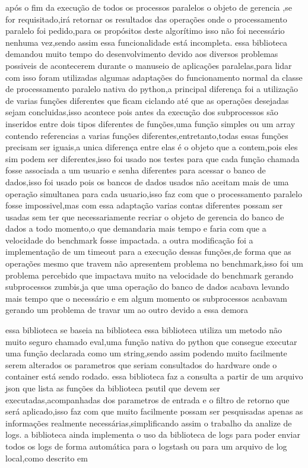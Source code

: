 \documentclass[
	12pt,				%
	openright,			%
	oneside,			%
	a4paper,			%
	english,			%
	french,				%
	spanish,			%
	brazil,				%
	]{abntex2}
\begin{document}
após o fim da execução de todos os processos paralelos o objeto de gerencia ,se for requisitado,irá retornar os resultados das operações onde o processamento paralelo foi pedido,para os propósitos deste algorítimo isso não foi necessário nenhuma vez,sendo assim essa funcionalidade está incompleta.
essa biblioteca demandou muito tempo do desenvolvimento devido aos diversos problemas possiveis de acontecerem durante o manuseio de aplicações paralelas,para lidar com isso foram utilizadas algumas adaptações do funcionamento normal da classe de processamento paralelo nativa do python,a principal diferença foi a utilização de varias funções diferentes que ficam ciclando até que as operações desejadas sejam concluidas,isso acontece pois antes da execução dos subprocessos são inseridos entre dois tipos diferentes de funções,uma função simples ou um array contendo referencias a varias funções diferentes,entretanto,todas essas funções precisam ser iguais,a unica diferença entre elas é o objeto que a contem,pois eles sim podem ser diferentes,isso foi usado nos testes para que cada função chamada fosse associada a um usuario e senha diferentes para acessar o banco de dados,isso foi usado pois os bancos de dados usados não aceitam mais de uma operação simultanea para cada usuario,isso faz com que o processamento paralelo fosse impossivel,mas com essa adaptação varias contas diferentes possam ser usadas sem ter que necessariamente recriar o objeto de gerencia do banco de dados a todo momento,o que demandaria mais tempo e faria com que a velocidade do benchmark fosse impactada.
a outra modificação foi a implementação de um timeout para a execução dessas funções,de forma que as operações mesmo que travem não apresentem problema no benchmark,isso foi um problema percebido que impactava muito na velocidade do benchmark gerando subprocessos zumbis,ja que uma operação do banco de dados acabava levando mais tempo que o necessário e em algum momento os subprocessos acabavam gerando um problema de travar um ao outro devido a essa demora

essa biblioteca se baseia na biblioteca  essa biblioteca utiliza um metodo não muito seguro chamado eval,uma função nativa do python que consegue executar uma função declarada como um string,sendo assim podendo muito facilmente serem alterados os parametros que seriam consultados do hardware onde o container está sendo rodado.
essa biblioteca faz a consulta a partir de um arquivo json que lista as funções da biblioteca psutil que devem ser executadas,acompanhadas dos parametros de entrada e o filtro de retorno que será aplicado,isso faz com que muito facilmente possam ser pesquisadas apenas as informações realmente necessárias,simplificando assim o trabalho da analize de logs.
a biblioteca ainda implementa o uso da biblioteca de logs para poder enviar todos os logs de forma automática para o logstash ou para um arquivo de log local,como descrito em 
\end{document}
